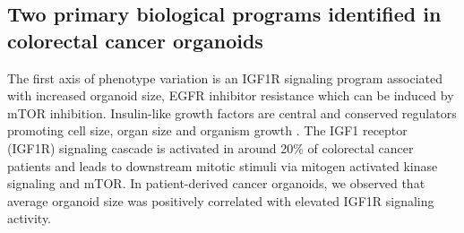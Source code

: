 \begin{flushleft}
\subsection{Two primary biological programs identified in colorectal cancer organoids}

The first axis of phenotype variation is an IGF1R signaling program associated with increased organoid size, EGFR inhibitor resistance which can be induced by mTOR inhibition. Insulin-like growth factors are central and conserved regulators promoting cell size, organ size and organism growth \citep{pucheHumanConditionsInsulinlike2012, sunMechanismCellSize2006}. The IGF1 receptor (IGF1R) signaling cascade is activated in around 20\% of colorectal cancer patients and leads to downstream mitotic stimuli via mitogen activated kinase signaling and mTOR\citep{zhongOverproductionIGF2Drives2017}. In patient-derived cancer organoids, we observed that average organoid size was positively correlated with elevated IGF1R signaling activity.
\smallbreak


\end{flushleft}
